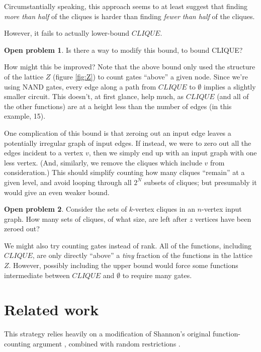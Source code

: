 \documentclass[12pt]{article}
\theoremstyle{definition}
\newtheorem{prob}{Open problem}[section]
\begin{document}
Circumstantially speaking, this approach seems to at least suggest
that finding {\em more than half} of the cliques is harder than finding
{\em fewer than half} of the cliques.

However, it fails to actually lower-bound $CLIQUE$.

\begin{prob}
\label{lpRepair}
Is there a way to modify this bound, to bound CLIQUE?
\end{prob}

How might this be improved?
Note that the above bound only used the structure of the lattice $Z$ 
(figure \ref{fig:Z}) to count gates ``above'' a given node.
Since we're using NAND gates, every edge along a path from $CLIQUE$ to $\emptyset$
implies a slightly smaller circuit. This doesn't, at first glance, help much, as
$CLIQUE$ (and all of the other functions) are at a height less than the number of edges
(in this example, 15).

One complication of this bound is that zeroing out an input edge leaves a potentially
irregular graph of input edges. If instead, we were to zero out all the edges incident to a
vertex $v$, then we simply end up with an input graph with one less vertex.
(And, similarly, we remove the cliques which include $v$ from consideration.)
This should simplify counting how many cliques ``remain'' at a given level, and avoid
looping through all $2^N$ subsets of cliques; but
presumably it would give an even weaker bound.

\begin{prob}
\label{vertexZonkingCount}
Consider the sets of $k$-vertex cliques in an $n$-vertex input graph.
How many sets of cliques, of what size,
are left after $z$ vertices have been zeroed out?
\end{prob}

We might also try counting gates instead of rank.
All of the functions, including $CLIQUE$, are only directly
``above'' a {\em tiny} fraction of the functions
in the lattice $Z$. However, possibly including the upper bound would force some
functions intermediate between $CLIQUE$ and $\emptyset$ to require many gates.

\section{Related work}

This strategy relies heavily on a modification of Shannon's original
function-counting argument \cite{shannon_synthesis_1949},
combined with random restrictions
\cite{subbotovskaya1963comparison}\cite{hastad1987lower}.
\end{document}
